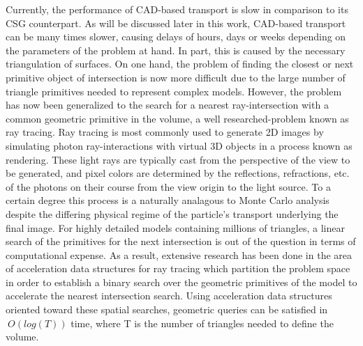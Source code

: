 \documentclass[12pt, a4paper]{article}
\begin{document}
Currently, the performance of CAD-based transport is slow in comparison to its CSG counterpart. As will be discussed later in this work, CAD-based transport can be many times slower, causing delays of hours, days or weeks depending on the parameters of the problem at hand. In part, this is caused by the necessary triangulation of surfaces. On one hand, the problem of finding the closest or next primitive object of intersection is now more difficult due to the large number of triangle primitives needed to represent complex models. However, the problem has now been generalized to the search for a nearest ray-intersection with a common geometric primitive in the volume, a well researched-problem known as ray tracing. Ray tracing is most commonly used to generate 2D images by simulating photon ray-interactions with virtual 3D objects in a process known as rendering. These light rays are typically cast from the perspective of the view to be generated, and pixel colors are determined by the reflections, refractions, etc. of the photons on their course from the view origin to the light source. To a certain degree this process is a naturally analagous to Monte Carlo analysis despite the differing physical regime of the particle's transport underlying the final image. For highly detailed models containing millions of triangles, a linear search of the primitives for the next intersection is out of the question in terms of computational expense. As a result, extensive research has been done in the area of acceleration data structures for ray tracing which partition the problem space in order to establish a binary search over the geometric primitives of the model to accelerate the nearest intersection search. Using acceleration data structures oriented toward these spatial searches, geometric queries can be satisfied in $~O(log(T))$ time, where T is the number of triangles needed to define the volume.


\end{document}

